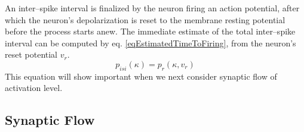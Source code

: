 	An inter--spike interval is finalized by the neuron firing an action potential, after which the neuron's depolarization is reset to the membrane resting potential before the process starts anew.
	The immediate estimate of the total inter--spike interval can be computed by eq. \eqref{eqEstimatedTimeToFiring}, from the neuron's reset potential $v_r$.
\begin{equation}
	p_{isi}(\kappa) = p_r(\kappa, v_r)%
	\label{eqEstimateOfInterSpikePeriod}
\end{equation}
	This equation will show important when we next consider synaptic flow of activation level.
	


    \subsection{Synaptic Flow}
	\label{ssecSynapticFlow}


